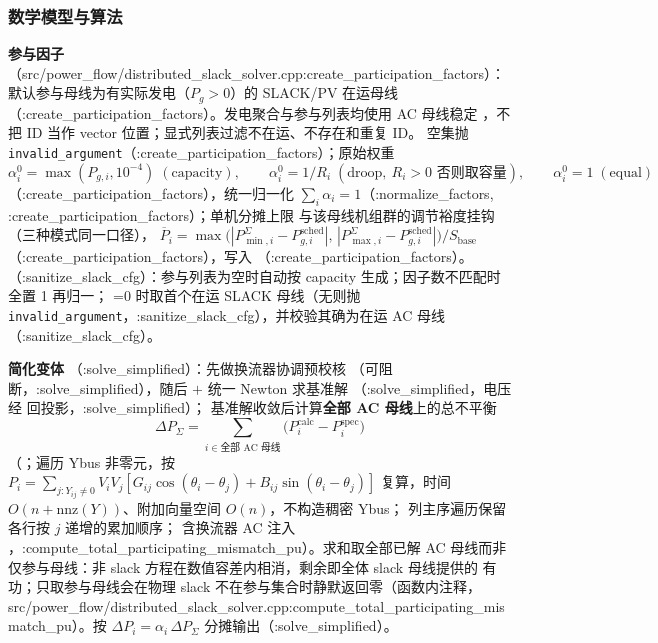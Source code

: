\subsubsection*{数学模型与算法}
\textbf{参与因子}（src/power\_flow/distributed\_slack\_solver.cpp:create\_participation\_factors）：默认参与母线为有实际发电（$P_g>0$）的 SLACK/PV
在运母线（:create\_participation\_factors）。发电聚合与参与列表均使用 AC 母线稳定
，不把 ID 当作 vector 位置；显式列表过滤不在运、不存在和重复 ID。
空集抛 \texttt{invalid\_argument}（:create\_participation\_factors）；原始权重
\[
\alpha_i^{0}=\max(P_{g,i},10^{-4})\;(\text{capacity}),\qquad
\alpha_i^{0}=1/R_i\;(\text{droop},\ R_i>0\text{ 否则取容量}),\qquad
\alpha_i^{0}=1\;(\text{equal})
\]
（:create\_participation\_factors），统一归一化 $\sum_i\alpha_i=1$（:normalize\_factors, :create\_participation\_factors）；单机分摊上限
与该母线机组群的调节裕度挂钩（三种模式同一口径），
$\overline P_i=\max\big(|P_{\min,i}^{\Sigma}-P_{g,i}^{\mathrm{sched}}|,\,
|P_{\max,i}^{\Sigma}-P_{g,i}^{\mathrm{sched}}|\big)/S_{\mathrm{base}}$
（:create\_participation\_factors），写入 （:create\_participation\_factors）。
（:sanitize\_slack\_cfg）：参与列表为空时自动按 capacity 生成；因子数不匹配时全置 1 再归一；
=0 时取首个在运 SLACK 母线（无则抛
\texttt{invalid\_argument}，:sanitize\_slack\_cfg），并校验其确为在运 AC 母线（:sanitize\_slack\_cfg）。

\textbf{简化变体} （:solve\_simplified）：先做换流器协调预校核
（可阻断，:solve\_simplified），随后  $+$ 统一 Newton 求基准解
（:solve\_simplified，电压经  回投影，:solve\_simplified）；
基准解收敛后计算\textbf{全部 AC 母线}上的总不平衡
\[
\Delta P_{\Sigma}=\sum_{i\in\text{全部 AC 母线}}\big(P_i^{\mathrm{calc}}-P_i^{\mathrm{spec}}\big)
\]
（；遍历 Ybus 非零元，按
$P_i=\sum_{j:Y_{ij}\ne0}V_iV_j[G_{ij}\cos(\theta_i-\theta_j)+B_{ij}\sin(\theta_i-\theta_j)]$
复算，时间 $O(n+\mathrm{nnz}(Y))$、附加向量空间 $O(n)$，不构造稠密 Ybus；
列主序遍历保留各行按 $j$ 递增的累加顺序；
含换流器 AC 注入 ，:compute\_total\_participating\_mismatch\_pu）。求和取全部已解 AC
母线而非仅参与母线：非 slack 方程在数值容差内相消，剩余即全体 slack 母线提供的
有功；只取参与母线会在物理 slack 不在参与集合时静默返回零（函数内注释，
src/power\_flow/distributed\_slack\_solver.cpp:compute\_total\_participating\_mismatch\_pu）。按
$\Delta P_i=\alpha_i\,\Delta P_{\Sigma}$ 分摊输出（:solve\_simplified）。

